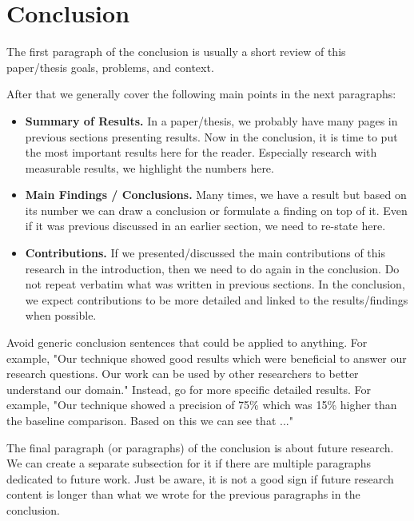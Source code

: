 
\chapter{Conclusion}\label{ch:conclusion}

The first paragraph of the conclusion is usually a short review of this paper/thesis goals, problems, and context. 

After that we generally cover the following main points in the next paragraphs:

\begin{itemize}
\item \textbf{Summary of Results.} 
   In a paper/thesis, we probably have many pages in previous sections presenting results. 
   Now in the conclusion, it is time to put the most important results here for the reader. 
   Especially research with measurable results, we highlight the numbers here. 
\item \textbf{Main Findings / Conclusions.} 
   Many times, we have a result but based on its number we can draw a conclusion or formulate a finding on top of it. 
   Even if it was previous discussed in an earlier section, we need to re-state here. 
\item \textbf{Contributions.} 
   If we presented/discussed the main contributions of this research in the introduction, then we need to do again in the conclusion.
   Do not repeat verbatim what was written in previous sections. 
   In the conclusion, we expect contributions to be more detailed and linked to the results/findings when possible.
\end{itemize}

Avoid generic conclusion sentences that could be applied to anything. 
For example, "Our technique showed good results which were beneficial to answer our research questions. 
Our work can be used by other researchers to better understand our domain."
Instead, go for more specific detailed results.
For example, "Our technique showed a precision of 75\% which was 15\% higher than the baseline comparison. 
Based on this we can see that ..."

The final paragraph (or paragraphs) of the conclusion is about future research. 
We can create a separate subsection for it if there are multiple paragraphs dedicated to future work. 
Just be aware, it is not a good sign if future research content is longer than what we wrote for the previous paragraphs in the conclusion.
